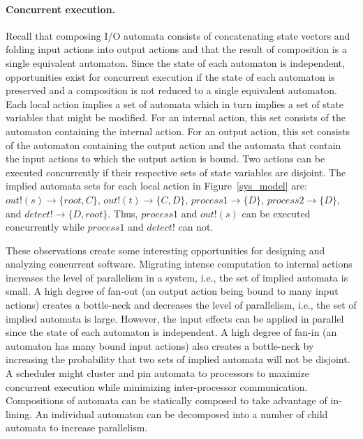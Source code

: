 \paragraph{Concurrent execution.}
Recall that composing I/O automata consists of concatenating state vectors and folding input actions into output actions and that the result of composition is a single equivalent automaton.
Since the state of each automaton is independent, opportunities exist for concurrent execution if the state of each automaton is preserved and a composition is not reduced to a single equivalent automaton.
Each local action implies a set of automata which in turn implies a set of state variables that might be modified.
For an internal action, this set consists of the automaton containing the internal action.
For an output action, this set consists of the automaton containing the output action and the automata that contain the input actions to which the output action is bound.
Two actions can be executed concurrently if their respective sets of state variables are disjoint.
The implied automata sets for each local action in Figure~\ref{sys_model} are: $out!(s) \to \{root, C\}$, $out!(t) \to \{C, D\}$, $process1 \to \{D\}$, $process2 \to \{D\}$, and $detect! \to \{D, root\}$.
Thus, $process1$ and $out!(s)$ can be executed concurrently while $process1$ and $detect!$ can not.

These observations create some interesting opportunities for designing and analyzing concurrent software.
Migrating intense computation to internal actions increases the level of parallelism in a system, i.e., the set of implied automata is small.
A high degree of fan-out (an output action being bound to many input actions) creates a bottle-neck and decreases the level of parallelism, i.e., the set of implied automata is large.
However, the input effects can be applied in parallel since the state of each automaton is independent.
A high degree of fan-in (an automaton has many bound input actions) also creates a bottle-neck by increasing the probability that two sets of implied automata will not be disjoint.
A scheduler might cluster and pin automata to processors to maximize concurrent execution while minimizing inter-processor communication.
Compositions of automata can be statically composed to take advantage of in-lining.
An individual automaton can be decomposed into a number of child automata to increase parallelism.

